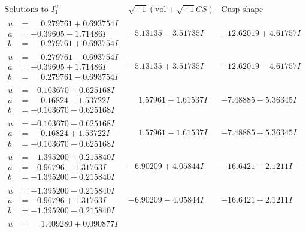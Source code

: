 \documentclass[1p]{elsarticle_modified}
\theoremstyle{definition}
\newcommand{\I}{\sqrt{-1}}
\begin{document}
$$\begin{array}{c|c|c}  
\text{Solutions to }I^u_{1}& \I (\text{vol} + \sqrt{-1}CS) & \text{Cusp shape}\\
 \hline 
\begin{aligned}
u &= \phantom{-}0.279761 + 0.693754 I \\
a &= -0.39605 - 1.71486 I \\
b &= \phantom{-}0.279761 + 0.693754 I\end{aligned}
 & -5.13135 - 3.51735 I & -12.62019 + 4.61757 I \\ \hline\begin{aligned}
u &= \phantom{-}0.279761 - 0.693754 I \\
a &= -0.39605 + 1.71486 I \\
b &= \phantom{-}0.279761 - 0.693754 I\end{aligned}
 & -5.13135 + 3.51735 I & -12.62019 - 4.61757 I \\ \hline\begin{aligned}
u &= -0.103670 + 0.625168 I \\
a &= \phantom{-}0.16824 - 1.53722 I \\
b &= -0.103670 + 0.625168 I\end{aligned}
 & \phantom{-}1.57961 + 1.61537 I & -7.48885 - 5.36345 I \\ \hline\begin{aligned}
u &= -0.103670 - 0.625168 I \\
a &= \phantom{-}0.16824 + 1.53722 I \\
b &= -0.103670 - 0.625168 I\end{aligned}
 & \phantom{-}1.57961 - 1.61537 I & -7.48885 + 5.36345 I \\ \hline\begin{aligned}
u &= -1.395200 + 0.215840 I \\
a &= -0.96796 - 1.31763 I \\
b &= -1.395200 + 0.215840 I\end{aligned}
 & -6.90209 + 4.05844 I & -16.6421 - 2.1211 I \\ \hline\begin{aligned}
u &= -1.395200 - 0.215840 I \\
a &= -0.96796 + 1.31763 I \\
b &= -1.395200 - 0.215840 I\end{aligned}
 & -6.90209 - 4.05844 I & -16.6421 + 2.1211 I \\ \hline\begin{aligned}
u &= \phantom{-}1.409280 + 0.090877 I \\

\end{aligned}
\end{array}$$
\end{document}
